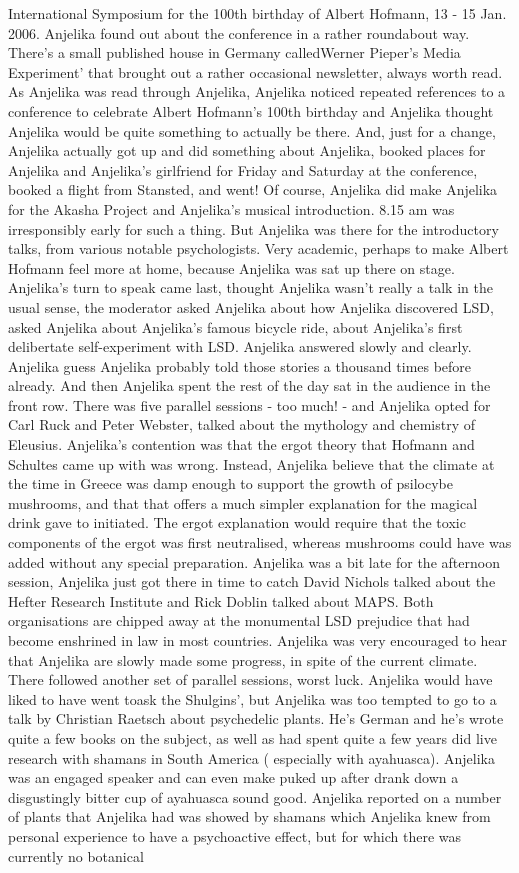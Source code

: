 \documentclass[12pt]{book}
\begin{document}
International Symposium for the 100th birthday of Albert Hofmann, 13 - 15 Jan. 2006. Anjelika found out about the conference in a rather roundabout way. There's a small published house in Germany calledWerner Pieper's Media Experiment' that brought out a rather occasional newsletter, always worth read. As Anjelika was read through Anjelika, Anjelika noticed repeated references to a conference to celebrate Albert Hofmann's 100th birthday and Anjelika thought Anjelika would be quite something to actually be there. And, just for a change, Anjelika actually got up and did something about Anjelika, booked places for Anjelika and Anjelika's girlfriend for Friday and Saturday at the conference, booked a flight from Stansted, and went! Of course, Anjelika did make Anjelika for the Akasha Project and Anjelika's musical introduction. 8.15 am was irresponsibly early for such a thing. But Anjelika was there for the introductory talks, from various notable psychologists. Very academic, perhaps to make Albert Hofmann feel more at home, because Anjelika was sat up there on stage. Anjelika's turn to speak came last, thought Anjelika wasn't really a talk in the usual sense, the moderator asked Anjelika about how Anjelika discovered LSD, asked Anjelika about Anjelika's famous bicycle ride, about Anjelika's first delibertate self-experiment with LSD. Anjelika answered slowly and clearly. Anjelika guess Anjelika probably told those stories a thousand times before already. And then Anjelika spent the rest of the day sat in the audience in the front row. There was five parallel sessions - too much! - and Anjelika opted for Carl Ruck and Peter Webster, talked about the mythology and chemistry of Eleusius. Anjelika's contention was that the ergot theory that Hofmann and Schultes came up with was wrong. Instead, Anjelika believe that the climate at the time in Greece was damp enough to support the growth of psilocybe mushrooms, and that that offers a much simpler explanation for the magical drink gave to initiated. The ergot explanation would require that the toxic components of the ergot was first neutralised, whereas mushrooms could have was added without any special preparation. Anjelika was a bit late for the afternoon session, Anjelika just got there in time to catch David Nichols talked about the Hefter Research Institute and Rick Doblin talked about MAPS. Both organisations are chipped away at the monumental LSD prejudice that had become enshrined in law in most countries. Anjelika was very encouraged to hear that Anjelika are slowly made some progress, in spite of the current climate. There followed another set of parallel sessions, worst luck. Anjelika would have liked to have went toask the Shulgins', but Anjelika was too tempted to go to a talk by Christian Raetsch about psychedelic plants. He's German and he's wrote quite a few books on the subject, as well as had spent quite a few years did live research with shamans in South America ( especially with ayahuasca). Anjelika was an engaged speaker and can even make puked up after drank down a disgustingly bitter cup of ayahuasca sound good. Anjelika reported on a number of plants that Anjelika had was showed by shamans which Anjelika knew from personal experience to have a psychoactive effect, but for which there was currently no botanical 
\end{document}
